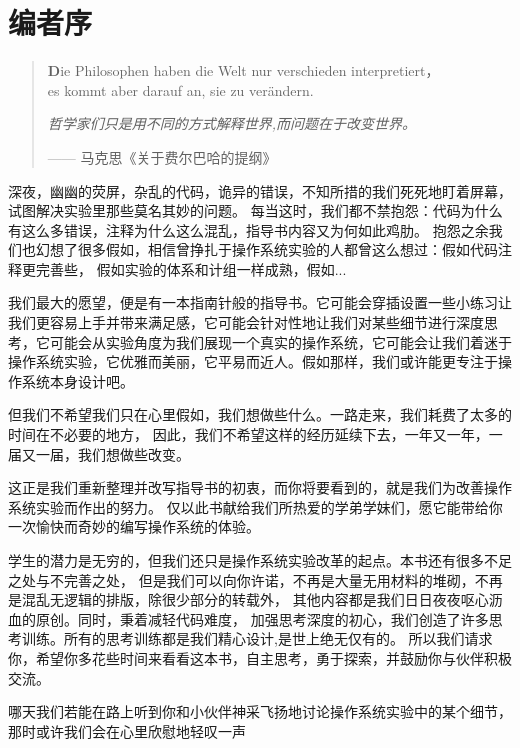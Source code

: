 \chapter{编者序}

\begin{quotation}
  \begin{flushright}
{\LARGE \textbf{D}}{ie Philosophen haben die Welt nur verschieden interpretiert，\\
es kommt aber darauf an, sie zu verändern.} \par
\textit{哲学家们只是用不同的方式解释世界,而问题在于改变世界。}\par
—— {\small 马克思《关于费尔巴哈的提纲》}
  \end{flushright}
\end{quotation}

深夜，幽幽的荧屏，杂乱的代码，诡异的错误，不知所措的我们死死地盯着屏幕，试图解决实验里那些莫名其妙的问题。
每当这时，我们都不禁抱怨：代码为什么有这么多错误，注释为什么这么混乱，指导书内容又为何如此鸡肋。
抱怨之余我们也幻想了很多假如，相信曾挣扎于操作系统实验的人都曾这么想过：假如代码注释更完善些，
假如实验的体系和计组一样成熟，假如...\par
我们最大的愿望，便是有一本指南针般的指导书。它可能会穿插设置一些小练习让我们更容易上手并带来满足感，它可能会针对性地让我们对某些细节进行深度思考，它可能会从实验角度为我们展现一个真实的操作系统，它可能会让我们着迷于操作系统实验，它优雅而美丽，它平易而近人。假如那样，我们或许能更专注于操作系统本身设计吧。

但我们不希望我们只在心里假如，我们想做些什么。一路走来，我们耗费了太多的时间在不必要的地方，
因此，我们不希望这样的经历延续下去，一年又一年，一届又一届，我们想做些改变。

这正是我们重新整理并改写指导书的初衷，而你将要看到的，就是我们为改善操作系统实验而作出的努力。
仅以此书献给我们所热爱的学弟学妹们，愿它能带给你一次愉快而奇妙的编写操作系统的体验。

学生的潜力是无穷的，但我们还只是操作系统实验改革的起点。本书还有很多不足之处与不完善之处，
但是我们可以向你许诺，不再是大量无用材料的堆砌，不再是混乱无逻辑的排版，除很少部分的转载外，
其他内容都是我们日日夜夜呕心沥血的原创。同时，秉着减轻代码难度，
加强思考深度的初心，我们创造了许多思考训练。所有的思考训练都是我们精心设计,是世上绝无仅有的。
所以我们请求你，希望你多花些时间来看看这本书，自主思考，勇于探索，并鼓励你与伙伴积极交流。

哪天我们若能在路上听到你和小伙伴神采飞扬地讨论操作系统实验中的某个细节，
那时或许我们会在心里欣慰地轻叹一声

